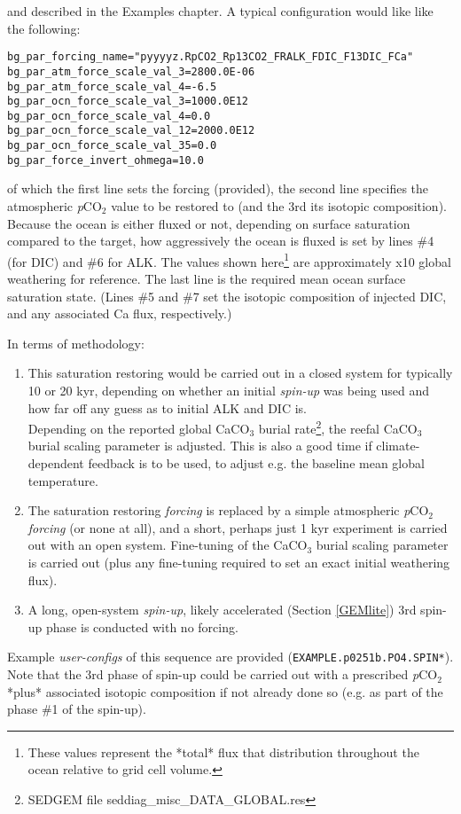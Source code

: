 \begin{enumerate}
and described in the Examples chapter. A typical configuration would like like the following:
\vspace{-1mm}\small\begin{verbatim}
bg_par_forcing_name="pyyyyz.RpCO2_Rp13CO2_FRALK_FDIC_F13DIC_FCa"
bg_par_atm_force_scale_val_3=2800.0E-06
bg_par_atm_force_scale_val_4=-6.5
bg_par_ocn_force_scale_val_3=1000.0E12
bg_par_ocn_force_scale_val_4=0.0
bg_par_ocn_force_scale_val_12=2000.0E12
bg_par_ocn_force_scale_val_35=0.0
bg_par_force_invert_ohmega=10.0
\end{verbatim}\normalsize\vspace{-1mm}
of which the first line sets the forcing (provided), the second line specifies the atmospheric \textit{p}CO\(_{2}\) value to be restored to (and the 3rd its isotopic composition). Because the ocean is either fluxed or not, depending on surface saturation compared to the target, how aggressively the ocean is fluxed is set by lines \#4 (for DIC) and \#6 for ALK. The values shown here\footnote{These values represent the *total* flux that distribution throughout the ocean relative to grid cell volume.} are approximately x10 global weathering for reference. The last line is the required mean ocean surface saturation state. (Lines \#5 and \#7 set the isotopic composition of injected DIC, and any associated Ca flux, respectively.)

In terms of methodology:
\begin{enumerate}
\vspace{1mm}
        \item This saturation restoring would be carried out in a closed system for typically 10 or 20 kyr, depending on whether an initial \textit{spin-up} was being used and how far off any guess as to initial ALK and DIC is.
        \\ Depending on the reported global CaCO$_{3}$ burial rate\footnote{SEDGEM file seddiag\_misc\_DATA\_GLOBAL.res}, the reefal CaCO$_{3}$ burial scaling parameter is adjusted. This is also a good time if climate-dependent feedback is to be used, to adjust e.g. the baseline mean global temperature.
\vspace{1mm}
        \item The saturation restoring \textit{forcing} is replaced by a simple atmospheric \textit{p}CO\(_{2}\)\textit{forcing} (or none at all), and a short, perhaps just 1 kyr experiment is carried out with an open system. Fine-tuning of the CaCO$_{3}$ burial scaling parameter is carried out (plus any fine-tuning required to set an exact initial weathering flux).
\vspace{1mm}
        \item A long, open-system \textit{spin-up}, likely accelerated (Section \ref{GEMlite}) 3rd spin-up phase is conducted with no forcing.
\end{enumerate}
Example \textit{user-configs} of this sequence are provided (\texttt{EXAMPLE.p0251b.PO4.SPIN*}).
Note that the 3rd phase of spin-up could be carried out with a prescribed \textit{p}CO\(_{2}\) *plus* associated isotopic composition if not already done so (e.g. as part of the phase \#1 of the spin-up).


\end{enumerate}
